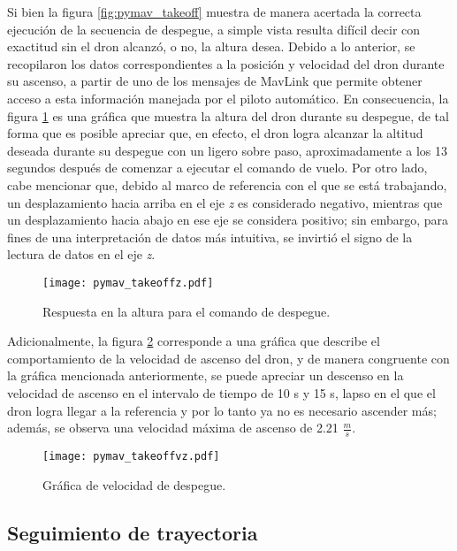 Si bien la figura \ref{fig:pymav_takeoff} muestra de manera acertada la correcta ejecución de la secuencia de despegue, a simple vista resulta difícil decir con exactitud sin el dron alcanzó, o no, la altura desea. Debido a lo anterior, se recopilaron los datos correspondientes a la posición y velocidad del dron durante su ascenso, a partir de uno de los mensajes de MavLink que permite obtener acceso a esta información manejada por el piloto automático. En consecuencia, la figura \ref{fig:pymav_takeoffz} es una gráfica que muestra la altura del dron durante su despegue, de tal forma que es posible apreciar que, en efecto, el dron logra alcanzar la altitud deseada durante su despegue con un ligero sobre paso, aproximadamente a los 13 segundos después de comenzar a ejecutar el comando de vuelo. Por otro lado, cabe mencionar que, debido al marco de referencia con el que se está trabajando, un desplazamiento hacia arriba en el eje \textit{z} es considerado negativo, mientras que un desplazamiento hacia abajo en ese eje se considera positivo; sin embargo, para fines de una interpretación de datos más intuitiva, se invirtió el signo de la lectura de datos en el eje \textit{z}. 

\begin{figure}[h]
    \centering
    \texttt{[image: pymav\_takeoffz.pdf]}
    \caption{Respuesta en la altura para el comando de despegue.}
    \label{fig:pymav_takeoffz}
\end{figure}

Adicionalmente, la figura \ref{fig:pymav_takeoffvz} corresponde a una gráfica que describe el comportamiento de la velocidad de ascenso del dron, y de manera congruente con la gráfica mencionada anteriormente, se puede apreciar un descenso en la velocidad de ascenso en el intervalo de tiempo de 10 s y 15 s, lapso en el que el dron logra llegar a la referencia y por lo tanto ya no es necesario ascender más;  además, se observa una velocidad máxima de ascenso de 2.21 $\frac{m}{s}$.

\begin{figure}[ht]
    \centering
    \texttt{[image: pymav\_takeoffvz.pdf]}
    \caption{Gráfica de velocidad de despegue.}
    \label{fig:pymav_takeoffvz}
\end{figure}

\subsection{Seguimiento de trayectoria}

